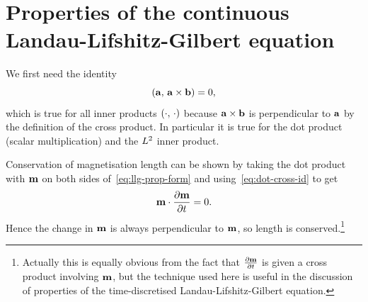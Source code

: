 \section{Properties of the continuous Landau-Lifshitz-Gilbert equation}
\label{sec:prop-cont-llg}

We first need the identity
\begin{equation}
  \label{eq:dot-cross-id}
  \left({\mathbf{a}},\, {\mathbf{a}} \times {\mathbf{b}} \right) = 0,
\end{equation}
which is true for all inner products $\left(\cdot,\, \cdot \right)$ because ${\mathbf{a}} \times {\mathbf{b}}$ is perpendicular to ${\mathbf{a}}$ by the definition of the cross product.
In particular it is true for the dot product (scalar multiplication) and the $L^2$ inner product.

Conservation of magnetisation length can be shown by taking the dot product with $\mathbf{m}$ on both sides of~\eqref{eq:llg-prop-form} and using~\eqref{eq:dot-cross-id} to get
\begin{equation}
  \label{eq:56}
  \mathbf{m} \cdot \frac{\partial \mathbf{m}}{\partial t} = 0.
\end{equation}
Hence the change in $\mathbf{m}$ is always perpendicular to $\mathbf{m}$, so length is conserved.\footnote{Actually this is equally obvious from the fact that $\frac{\partial \mathbf{m}}{\partial t}$ is given a cross product involving $\mathbf{m}$, but the technique used here is useful in the discussion of properties of the time-discretised Landau-Lifshitz-Gilbert equation.}

